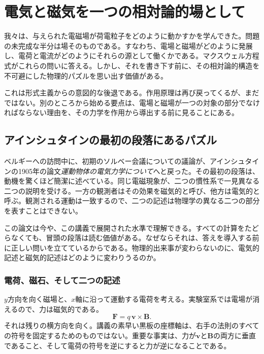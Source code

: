 \chapter{電気と磁気を一つの相対論的場として}

我々は、与えられた電磁場が荷電粒子をどのように動かすかを学んできた。問題の未完成な半分は場そのものである。すなわち、電場と磁場がどのように発展し、電荷と電流がどのようにそれらの源として働くかである。マクスウェル方程式がこれらの問いに答える。しかし、それを書き下す前に、その相対論的構造を不可避にした物理的パズルを思い出す価値がある。

これは形式主義からの意図的な後退である。作用原理は再び戻ってくるが、まだではない。別のところから始める要点は、電場と磁場が一つの対象の部分でなければならない理由を、その力学を作用から導出する前に見ることにある。

\section{アインシュタインの最初の段落にあるパズル}

ベルギーへの訪問中に、初期のソルベー会議についての議論が、アインシュタインの1905年の論文\emph{運動物体の電気力学について}へと戻った。その最初の段落は、動機を驚くほど簡潔に述べている。同じ電磁現象が、二つの慣性系で一見異なる二つの説明を受ける。一方の観測者はその効果を磁気的と呼び、他方は電気的と呼ぶ。観測される運動は一致するので、二つの記述は物理学の異なる二つの部分を表すことはできない。

この論文は今や、この講義で展開された水準で理解できる。すべての計算をたどらなくても、冒頭の段落は読む価値がある。なぜならそれは、答えを導入する前に正しい問いを立てているからである。物理的出来事が変わらないのに、電気的記述と磁気的記述はどのように変わりうるのか。

\subsection{電荷、磁石、そして二つの記述}

\(y\)方向を向く磁場と、\(x\)軸に沿って運動する電荷を考える。実験室系では電場が消えるので、力は磁気的である。
\begin{equation}
\mathbf F=q\,\mathbf v\times\mathbf B.
\end{equation}
それは残りの横方向を向く。講義の素早い黒板の座標軸は、右手の法則のすべての符号を固定するためのものではない。重要な事実は、力が\(\mathbf v\)と\(\mathbf B\)の両方に垂直であること、そして電荷の符号を逆にすると力が逆になることである。

